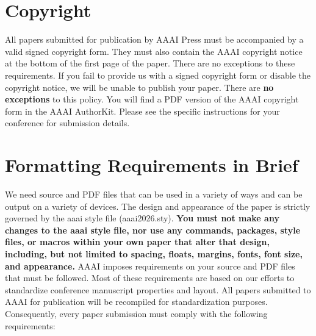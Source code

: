 \documentclass[letterpaper]{article} %
\begin{document}
\section{Copyright}
All papers submitted for publication by AAAI Press must be accompanied by a valid signed copyright form. They must also contain the AAAI copyright notice at the bottom of the first page of the paper. There are no exceptions to these requirements. If you fail to provide us with a signed copyright form or disable the copyright notice, we will be unable to publish your paper. There are \textbf{no exceptions} to this policy. You will find a PDF version of the AAAI copyright form in the AAAI AuthorKit. Please see the specific instructions for your conference for submission details.

\section{Formatting Requirements in Brief}
We need source and PDF files that can be used in a variety of ways and can be output on a variety of devices. The design and appearance of the paper is strictly governed by the aaai style file (aaai2026.sty).
\textbf{You must not make any changes to the aaai style file, nor use any commands, packages, style files, or macros within your own paper that alter that design, including, but not limited to spacing, floats, margins, fonts, font size, and appearance.} AAAI imposes requirements on your source and PDF files that must be followed. Most of these requirements are based on our efforts to standardize conference manuscript properties and layout. All papers submitted to AAAI for publication will be recompiled for standardization purposes. Consequently, every paper submission must comply with the following requirements:
\end{document}

